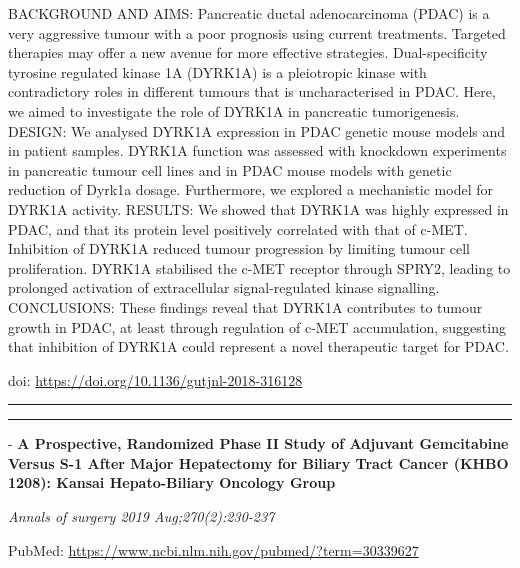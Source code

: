 \documentclass[]{article}
\begin{document}
BACKGROUND AND AIMS: Pancreatic ductal adenocarcinoma (PDAC) is a very
aggressive tumour with a poor prognosis using current treatments.
Targeted therapies may offer a new avenue for more effective strategies.
Dual-specificity tyrosine regulated kinase 1A (DYRK1A) is a pleiotropic
kinase with contradictory roles in different tumours that is
uncharacterised in PDAC. Here, we aimed to investigate the role of
DYRK1A in pancreatic tumorigenesis. DESIGN: We analysed DYRK1A
expression in PDAC genetic mouse models and in patient samples. DYRK1A
function was assessed with knockdown experiments in pancreatic tumour
cell lines and in PDAC mouse models with genetic reduction of Dyrk1a
dosage. Furthermore, we explored a mechanistic model for DYRK1A
activity. RESULTS: We showed that DYRK1A was highly expressed in PDAC,
and that its protein level positively correlated with that of c-MET.
Inhibition of DYRK1A reduced tumour progression by limiting tumour cell
proliferation. DYRK1A stabilised the c-MET receptor through SPRY2,
leading to prolonged activation of extracellular signal-regulated kinase
signalling. CONCLUSIONS: These findings reveal that DYRK1A contributes
to tumour growth in PDAC, at least through regulation of c-MET
accumulation, suggesting that inhibition of DYRK1A could represent a
novel therapeutic target for PDAC.

doi: \url{https://doi.org/10.1136/gutjnl-2018-316128}

{}

{}

\begin{center}\rule{0.5\linewidth}{\linethickness}\end{center}

\begin{center}\rule{0.5\linewidth}{\linethickness}\end{center}

 - \textbf{A Prospective, Randomized Phase II Study of Adjuvant
Gemcitabine Versus S-1 After Major Hepatectomy for Biliary Tract Cancer
(KHBO 1208): Kansai Hepato-Biliary Oncology Group}

\emph{Annals of surgery 2019 Aug;270(2):230-237}

PubMed: \url{https://www.ncbi.nlm.nih.gov/pubmed/?term=30339627}
\end{document}
